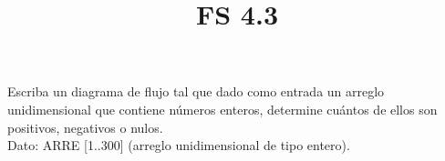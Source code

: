 \documentclass[11pt]{amsart}
\title{FS 4.3}
\begin{document}
\maketitle
\noindent Escriba un diagrama de flujo tal que dado como entrada un arreglo unidimensional que contiene números enteros, determine cuántos de ellos son positivos, negativos o nulos.\\

\noindent Dato: ARRE [1..300] (arreglo unidimensional de tipo entero).
\end{document}
